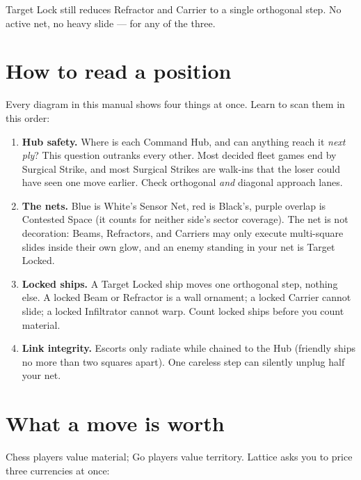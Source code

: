 \documentclass[11pt,a4paper]{article}
\begin{document}
Target Lock still reduces Refractor and Carrier to a single orthogonal step.
No active net, no heavy slide --- for any of the three.

\section{How to read a position}

Every diagram in this manual shows four things at once. Learn to scan them in
this order:

\begin{enumerate}
  \item \textbf{Hub safety.} Where is each Command Hub, and can anything reach
        it \emph{next ply}? This question outranks every other. Most decided
        fleet games end by Surgical Strike, and most Surgical Strikes are
        walk-ins that the loser could have seen one move earlier. Check
        orthogonal \emph{and} diagonal approach lanes.
  \item \textbf{The nets.} Blue is White's Sensor Net, red is Black's, purple
        overlap is Contested Space (it counts for neither side's sector
        coverage). The net is not decoration: Beams, Refractors, and Carriers
        may only execute multi-square slides inside their own glow, and an
        enemy standing in your net is Target Locked.
  \item \textbf{Locked ships.} A Target Locked ship moves one orthogonal step,
        nothing else. A locked Beam or Refractor is a wall ornament; a locked
        Carrier cannot slide; a locked Infiltrator cannot warp. Count locked
        ships before you count material.
  \item \textbf{Link integrity.} Escorts only radiate while chained to the Hub
        (friendly ships no more than two squares apart). One careless step can
        silently unplug half your net.
\end{enumerate}

\section{What a move is worth}

Chess players value material; Go players value territory. Lattice asks you to
price three currencies at once:
\end{document}
